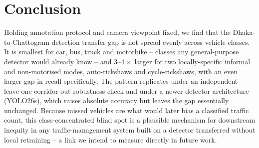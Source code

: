 \documentclass[conference,a4paper]{IEEEtran}
\begin{document}
\section{Conclusion}
Holding annotation protocol and camera viewpoint fixed, we find that the
Dhaka-to-Chattogram detection transfer gap is not spread evenly across vehicle classes. It is
smallest for car, bus, truck and motorbike -- classes any general-purpose detector
would already know -- and $3$--$4\times$ larger for two locally-specific informal and
non-motorised modes, auto-rickshaws and cycle-rickshaws, with an even larger gap in
recall specifically. The pattern replicates under an independent leave-one-corridor-out
robustness check and under a newer detector architecture (YOLO26s), which raises
absolute accuracy but leaves the gap essentially unchanged. Because missed vehicles are what would later bias a classified
traffic count, this class-concentrated blind spot is a plausible mechanism for
downstream inequity in any traffic-management system built on a detector transferred
without local retraining -- a link we intend to measure directly in future work.



\end{document}
